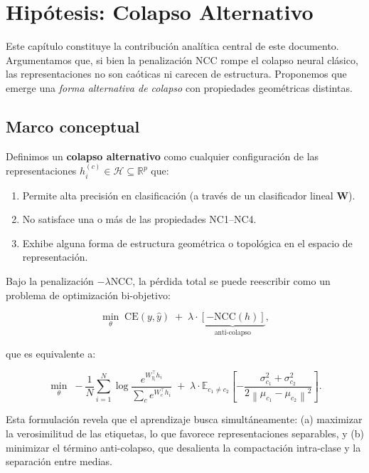 \documentclass[12pt,a4paper]{report}
\newcommand{\R}{\mathbb{R}}
\newcommand{\E}{\mathbb{E}}
\newcommand{\norm}[1]{\left\lVert#1\right\rVert}
\newcommand{\NCC}{\text{NCC}}
\newcommand{\CE}{\text{CE}}
\begin{document}
\chapter{Hipótesis: Colapso Alternativo}
\label{chap:alternativo}

Este capítulo constituye la contribución analítica central de este documento. Argumentamos que, si bien la penalización NCC rompe el colapso neural clásico, las representaciones no son caóticas ni carecen de estructura. Proponemos que emerge una \emph{forma alternativa de colapso} con propiedades geométricas distintas.

\section{Marco conceptual}

Definimos un \textbf{colapso alternativo} como cualquier configuración de las representaciones $h_i^{(c)} \in \mathcal{H} \subseteq \R^p$ que:

\begin{enumerate}
    \item Permite alta precisión en clasificación (a través de un clasificador lineal $\mathbf{W}$).
    \item No satisface una o más de las propiedades NC1--NC4.
    \item Exhibe alguna forma de estructura geométrica o topológica en el espacio de representación.
\end{enumerate}

Bajo la penalización $-\lambda\NCC$, la pérdida total se puede reescribir como un problema de optimización bi-objetivo:

\begin{equation}
    \min_{\theta} \; \CE(y, \hat{y}) \;+\; \lambda \cdot \underbrace{\left[-\NCC(h)\right]}_{\text{anti-colapso}},
\label{eq:biobjective}
\end{equation}

que es equivalente a:

\begin{equation}
    \min_{\theta} \; -\frac{1}{N}\sum_{i=1}^N \log\frac{e^{W_{y_i}^\top h_i}}{\sum_c e^{W_c^\top h_i}} \;+\; \lambda \cdot \E_{c_1 \neq c_2}\!\left[-\frac{\sigma_{c_1}^2 + \sigma_{c_2}^2}{2\norm{\mu_{c_1} - \mu_{c_2}}^2}\right].
\label{eq:loss_combined}
\end{equation}

Esta formulación revela que el aprendizaje busca simultáneamente: (a) maximizar la verosimilitud de las etiquetas, lo que favorece representaciones separables, y (b) minimizar el término anti-colapso, que desalienta la compactación intra-clase y la separación entre medias.
\end{document}
